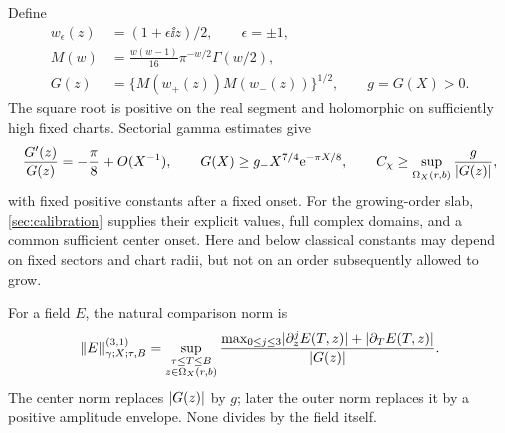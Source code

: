 Define
\begin{subequations}\label{eq:gamma-scale}
\begin{align}
 w_\epsilon(z)&=(1+\epsilon\ii z)/2,\qquad \epsilon=\pm1,\\
 M(w)&=\frac{w(w-1)}{16}\pi^{-w/2}\Gamma(w/2),\\
 G(z)&=\{M(w_+(z))M(w_-(z))\}^{1/2},\qquad g=G(X)>0.
\end{align}
\end{subequations}
The square root is positive on the real segment and holomorphic
on sufficiently high fixed charts. Sectorial gamma estimates
\cite{dlmfgamma} give
\begin{equation}
 \frac{G'(z)}{G(z)}=-\frac{\pi}{8}+O(X^{-1}),\qquad
 G(X)\ge g_-X^{7/4}\mathrm e^{-\pi X/8},\qquad
 C_\chi\ge\sup_{\Omega_X(r,b)}\frac{g}{\lvert G(z)\rvert},
 \label{eq:gamma-comparison}
\end{equation}
with fixed positive constants after a fixed onset.
For the growing-order slab, \cref{sec:calibration} supplies their explicit
values, full complex domains, and a common sufficient center onset.
Here and below classical constants may depend on fixed sectors
and chart radii, but not on an order subsequently allowed to grow.

For a field \(E\), the natural comparison norm is
\begin{equation}
 \lVert E\rVert_{\gamma;X;\tau,B}^{(3,1)}=\sup_{\substack{\tau\le T\le B\\z\in\Omega_X(r,b)}}
 \frac{\max_{0\le j\le3}\lvert \partial_z^jE(T,z)\rvert
                      +\lvert \partial_TE(T,z)\rvert}{\lvert G(z)\rvert}.
 \label{eq:natural-norm}
\end{equation}
The center norm replaces \(\lvert G(z)\rvert\) by \(g\); later the outer
norm replaces it by a positive amplitude envelope.
None divides by the field itself.

